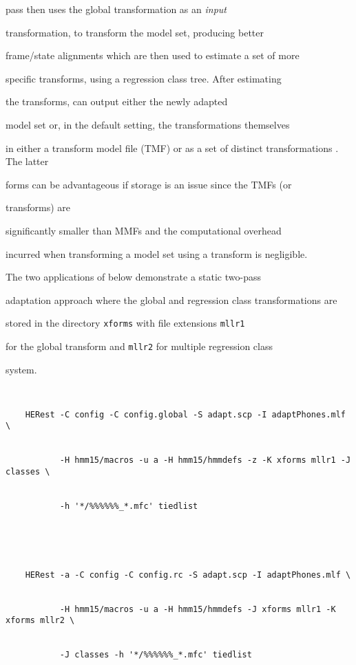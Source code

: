 pass then uses the global transformation as an {\em input}


transformation, to transform the model set, producing better


frame/state alignments which are then used to estimate a set of more


specific transforms, using a regression class tree.  After estimating


the transforms,  can output either the newly adapted


model set or, in the default setting, the transformations themselves


in either a transform model file (TMF) or as a set of distinct transformations .  The latter


forms can be advantageous if storage is an issue since the TMFs (or


transforms) are


significantly smaller than MMFs and the computational overhead


incurred when transforming a model set using a transform is negligible.


 


The two applications of  below demonstrate a static two-pass 


adaptation approach where the global and regression class transformations are 


stored in the directory \texttt{xforms} with file extensions \texttt{mllr1}


for the global transform and \texttt{mllr2} for multiple regression class


system.


\begin{verbatim}


    HERest -C config -C config.global -S adapt.scp -I adaptPhones.mlf \


           -H hmm15/macros -u a -H hmm15/hmmdefs -z -K xforms mllr1 -J classes \


           -h '*/%%%%%%_*.mfc' tiedlist





    HERest -a -C config -C config.rc -S adapt.scp -I adaptPhones.mlf \


           -H hmm15/macros -u a -H hmm15/hmmdefs -J xforms mllr1 -K xforms mllr2 \


           -J classes -h '*/%%%%%%_*.mfc' tiedlist


\end{verbatim}


